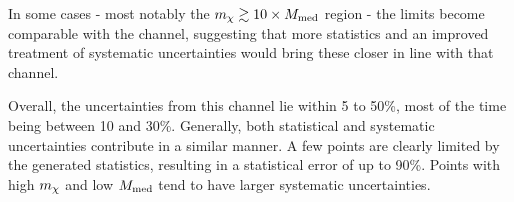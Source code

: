 In some cases - most notably the $m_{\chi} \gtrsim 10 \times M_{\mathrm{med}}$ region - the limits become comparable with the \monoZ channel, suggesting that more statistics and an improved treatment of systematic uncertainties would bring these closer in line with that channel.

Overall, the uncertainties from this channel lie within 5 to 50\%, most of the time being between 10 and 30\%. Generally, both statistical and systematic uncertainties contribute in a similar manner. A few points are clearly limited by the generated statistics, resulting in a statistical error of up to 90\%. Points with high $m_{\chi}$ and low $M_{\mathrm{med}}$ tend to have larger systematic uncertainties.

\afterpage{\clearpage}


